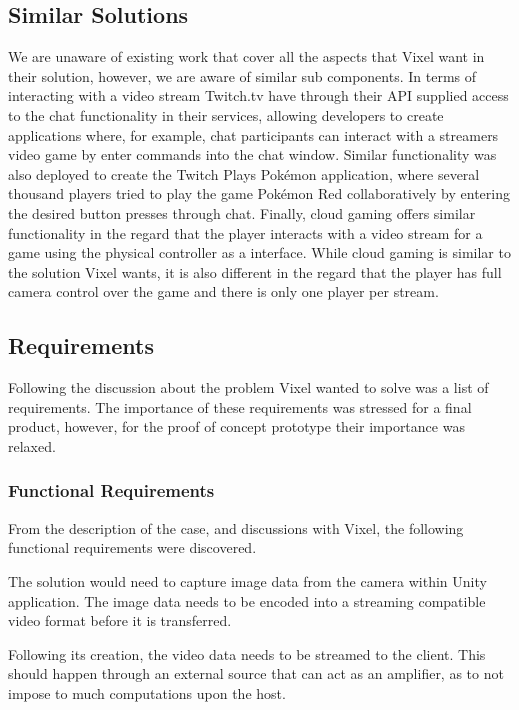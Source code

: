 \subsection{Similar Solutions}
We are unaware of existing work that cover all the aspects that Vixel want in their solution, however, we are aware of similar sub components. In terms of interacting with a video stream Twitch.tv have through their API supplied access to the chat functionality in their services, allowing developers to create applications where, for example, chat participants can interact with a streamers video game by enter commands into the chat window\cite{twitch_integration_clustertruck, twitch_integration_details}. Similar functionality was also deployed to create the Twitch Plays Pokémon application, where several thousand players tried to play the game Pokémon Red collaboratively by entering the desired button presses through chat\cite{twitch_plays_pokemon}. Finally, cloud gaming offers similar functionality in the regard that the player interacts with a video stream for a game using the physical controller as a interface. While cloud gaming is similar to the solution Vixel wants, it is also different in the regard that the player has full camera control over the game and there is only one player per stream.  


\subsection{Requirements}
Following the discussion about the problem Vixel wanted to solve was a list of requirements. The importance of these requirements was stressed for a final product, however, for the proof of concept prototype their importance was relaxed.

\subsubsection{Functional Requirements}
From the description of the case, and discussions with Vixel, the following functional requirements were discovered.

The solution would need to capture image data from the camera within Unity application. The image data needs to be encoded into a streaming compatible video format before it is transferred.

Following its creation, the video data needs to be streamed to the client. This should happen through an external source that can act as an amplifier, as to not impose to much computations upon the host.

